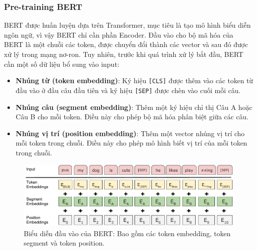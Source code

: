 \subsubsection{Pre-training BERT}

BERT được huấn luyện dựa trên Transformer, mục tiêu là tạo mô hình biểu diễn ngôn ngữ, vì vậy BERT chỉ cần phần Encoder. Đầu vào cho bộ mã hóa của BERT là một chuỗi các token, được chuyển đổi thành các vector và sau đó được xử lý trong mạng nơ-ron. Tuy nhiên, trước khi quá trình xử lý bắt đầu, BERT cần một số dữ liệu bổ sung vào input:

\begin{itemize}
    \item \textbf{Nhúng từ (token embedding)}: Ký hiệu {\tt [CLS]} được thêm vào các token từ đầu vào ở đầu câu đầu tiên và ký hiệu {\tt [SEP]} được chèn vào cuối mỗi câu.
    \item \textbf{Nhúng câu (segment embedding)}: Thêm một ký hiệu chỉ thị Câu A hoặc Câu B cho mỗi token. Điều này cho phép bộ mã hóa phân biệt giữa các câu.
    \item \textbf{Nhúng vị trí (position embedding)}: Thêm một vector nhúng vị trí cho mỗi token trong chuỗi. Điều này cho phép mô hình biết vị trí của mỗi token trong chuỗi.
\end{itemize}

\begin{figure}[htb]
    \centering
    \includegraphics[width=\textwidth]{image/Input_Emebeddings.pdf}
    \caption{Biểu diễn đầu vào của BERT: Bao gồm các token embedding, token segment và token position.}
    \label{figure:Input_Emebeddings}
\end{figure}

